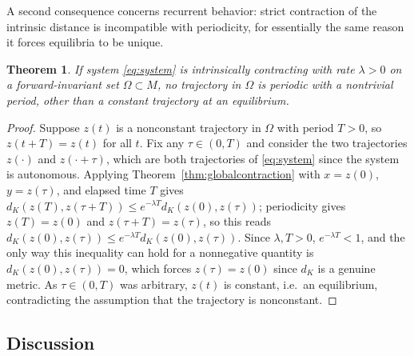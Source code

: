 \documentclass[preprint,12pt,authoryear]{elsarticle}
\newtheorem{theorem}{Theorem}
\newtheorem{proof}{Proof}
\begin{document}
A second consequence concerns recurrent behavior: strict contraction of the intrinsic distance is incompatible with periodicity, for essentially the same reason it forces equilibria to be unique.

\begin{theorem}
\label{thm:noperiodic}
If system \eqref{eq:system} is intrinsically contracting with rate $\lambda>0$ on a forward-invariant set $\Omega\subset M$, no trajectory in $\Omega$ is periodic with a nontrivial period, other than a constant trajectory at an equilibrium.
\end{theorem}

\begin{proof}
Suppose $z(t)$ is a nonconstant trajectory in $\Omega$ with period $T>0$, so $z(t+T)=z(t)$ for all $t$. Fix any $\tau\in(0,T)$ and consider the two trajectories $z(\cdot)$ and $z(\cdot+\tau)$, which are both trajectories of \eqref{eq:system} since the system is autonomous. Applying Theorem~\ref{thm:globalcontraction} with $x=z(0)$, $y=z(\tau)$, and elapsed time $T$ gives $d_K(z(T),z(\tau+T))\le e^{-\lambda T}d_K(z(0),z(\tau))$; periodicity gives $z(T)=z(0)$ and $z(\tau+T)=z(\tau)$, so this reads $d_K(z(0),z(\tau))\le e^{-\lambda T}d_K(z(0),z(\tau))$. Since $\lambda,T>0$, $e^{-\lambda T}<1$, and the only way this inequality can hold for a nonnegative quantity is $d_K(z(0),z(\tau))=0$, which forces $z(\tau)=z(0)$ since $d_K$ is a genuine metric. As $\tau\in(0,T)$ was arbitrary, $z(t)$ is constant, i.e.\ an equilibrium, contradicting the assumption that the trajectory is nonconstant.
\end{proof}

\subsection{Discussion}
\end{document}
